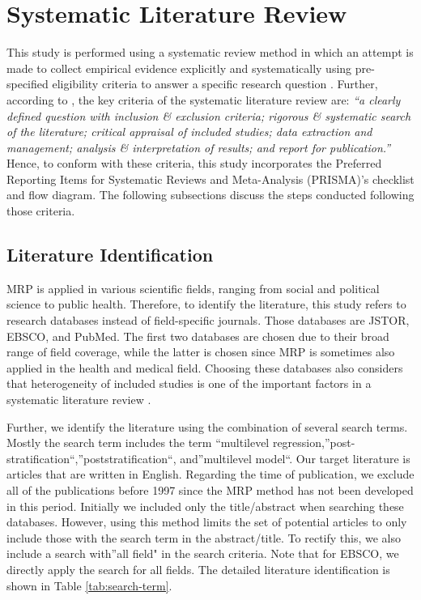 \documentclass{monashthesis}
\begin{document}
\hypertarget{sec:syslitrev}{%
\chapter{Systematic Literature Review}\label{sec:syslitrev}}

This study is performed using a systematic review method in which an attempt is made to collect empirical evidence explicitly and systematically using pre-specified eligibility criteria to answer a specific research question \autocite{cochrane}. Further, according to \textcite{brown_uni}, the key criteria of the systematic literature review are: \emph{``a clearly defined question with inclusion \& exclusion criteria; rigorous \& systematic search of the literature; critical appraisal of included studies; data extraction and management; analysis \& interpretation of results; and report for publication.''} Hence, to conform with these criteria, this study incorporates the Preferred Reporting Items for Systematic Reviews and Meta-Analysis (PRISMA)'s checklist and flow diagram. The following subsections discuss the steps conducted following those criteria.

\hypertarget{literature-identification}{%
\section{Literature Identification}\label{literature-identification}}

MRP is applied in various scientific fields, ranging from social and political science to public health. Therefore, to identify the literature, this study refers to research databases instead of field-specific journals. Those databases are JSTOR, EBSCO, and PubMed. The first two databases are chosen due to their broad range of field coverage, while the latter is chosen since MRP is sometimes also applied in the health and medical field. Choosing these databases also considers that heterogeneity of included studies is one of the important factors in a systematic literature review \autocite{SchweizerMarinL2017Apgt}.

Further, we identify the literature using the combination of several search terms. Mostly the search term includes the term ``multilevel regression,''post-stratification``,''poststratification``, and''multilevel model``. Our target literature is articles that are written in English. Regarding the time of publication, we exclude all of the publications before 1997 since the MRP method has not been developed in this period. Initially we included only the title/abstract when searching these databases. However, using this method limits the set of potential articles to only include those with the search term in the abstract/title. To rectify this, we also include a search with''all field" in the search criteria. Note that for EBSCO, we directly apply the search for all fields. The detailed literature identification is shown in Table \ref{tab:search-term}.
\end{document}
